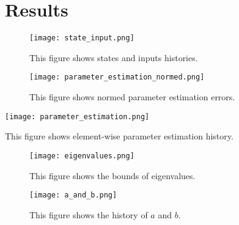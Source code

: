 \documentclass[nobib]{my-handout}
\begin{document}


\section{Results}

\begin{figure*}[h]
	\texttt{[image: state\_input.png]}
	\caption{This figure shows states and inputs histories.}
\end{figure*}


\begin{figure}[h]
	\texttt{[image: parameter\_estimation\_normed.png]}
	\caption{This figure shows normed parameter estimation errors.}
\end{figure}

\begin{marginfigure}[1cm]
	\texttt{[image: parameter\_estimation.png]}
	\caption{This figure shows element-wise parameter estimation history.}
\end{marginfigure}

\begin{figure}[h]
	\texttt{[image: eigenvalues.png]}
	\caption{This figure shows the bounds of eigenvalues.}
\end{figure}

\begin{figure*}[h]
	\texttt{[image: a\_and\_b.png]}
	\caption{This figure shows the history of $a$ and $b$.}
\end{figure*}



\end{document}
